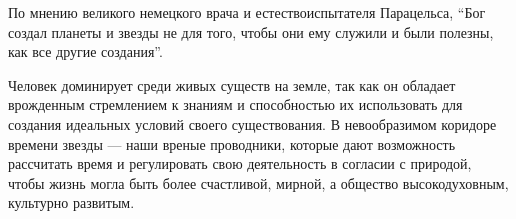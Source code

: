 По мнению великого немецкого врача и естествоиспытателя Парацельса, ``Бог создал планеты и звезды не для того, чтобы они ему служили и были полезны, как все другие создания''.

Человек доминирует среди живых существ на земле, так как он обладает врожденным стремлением к знаниям и способностью их использовать для создания идеальных условий своего существования. В невообразимом коридоре времени звезды --- наши вреные проводники, которые дают возможность рассчитать время и регулировать свою деятельность в согласии с природой, чтобы жизнь могла быть более счастливой, мирной, а общество высокодуховным, культурно развитым.
